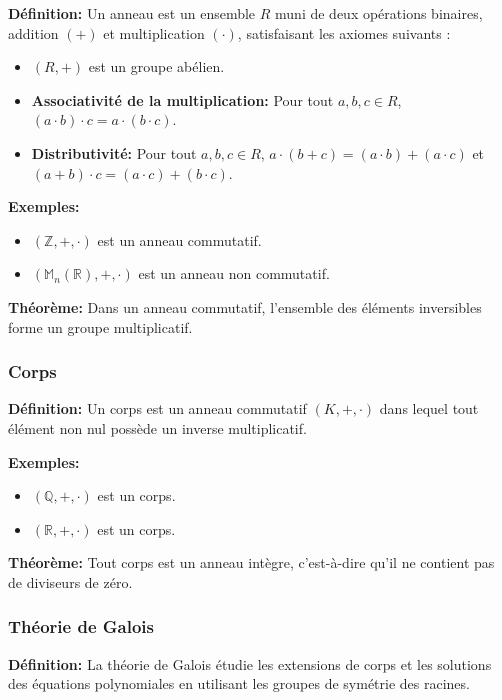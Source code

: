 \textbf{Définition:}
Un anneau est un ensemble $R$ muni de deux opérations binaires, addition $(+)$ et multiplication $(\cdot)$, satisfaisant les axiomes suivants :
\begin{itemize}
    \item $(R, +)$ est un groupe abélien.
    \item \textbf{Associativité de la multiplication:} Pour tout $a, b, c \in R$, $(a \cdot b) \cdot c = a \cdot (b \cdot c)$.
    \item \textbf{Distributivité:} Pour tout $a, b, c \in R$, $a \cdot (b + c) = (a \cdot b) + (a \cdot c)$ et $(a + b) \cdot c = (a \cdot c) + (b \cdot c)$.
\end{itemize}

\textbf{Exemples:}
\begin{itemize}
    \item $(\mathbb{Z}, +, \cdot)$ est un anneau commutatif.
    \item $(\mathbb{M}_n(\mathbb{R}), +, \cdot)$ est un anneau non commutatif.
\end{itemize}

\textbf{Théorème:}
Dans un anneau commutatif, l'ensemble des éléments inversibles forme un groupe multiplicatif.

\subsubsection{Corps}

\textbf{Définition:}
Un corps est un anneau commutatif $(K, +, \cdot)$ dans lequel tout élément non nul possède un inverse multiplicatif.

\textbf{Exemples:}
\begin{itemize}
    \item $(\mathbb{Q}, +, \cdot)$ est un corps.
    \item $(\mathbb{R}, +, \cdot)$ est un corps.
\end{itemize}

\textbf{Théorème:}
Tout corps est un anneau intègre, c'est-à-dire qu'il ne contient pas de diviseurs de zéro.

\subsubsection{Théorie de Galois}

\textbf{Définition:}
La théorie de Galois étudie les extensions de corps et les solutions des équations polynomiales en utilisant les groupes de symétrie des racines.


